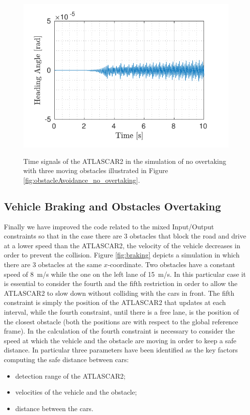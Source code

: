 \begin{figure}[!t]
\begin{minipage}[t]{0.5\textwidth}
		\subcaption{}\label{fig:delta_no_overtaking}
	\end{minipage}
	\begin{minipage}[t]{0.5\textwidth}
		\includegraphics[width=\textwidth]{../../MATLAB/no_overtaking/figure/HeadingAngleVsTime.pdf}
		\subcaption{}\label{fig:theta_no_overtaking}
	\end{minipage}
	\caption{Time signals of the ATLASCAR2 in the simulation of no overtaking with three moving obstacles illustrated in Figure \ref{fig:obstacleAvoidance_no_overtaking}.}
	\label{fig:components_no_overtaking}
\end{figure}

\subsection{Vehicle Braking and Obstacles Overtaking}
Finally we have improved the code related to the mixed Input/Output constraints so that in the case there are 3 obstacles that block the road and drive at a lower speed than the ATLASCAR2, the velocity of the vehicle decreases in order to prevent the collision. Figure \ref{fig:braking} depicts a simulation in which there are 3 obstacles at the same $x$-coordinate. Two obstacles have a constant speed of \SI{8}{m/s} while the one on the left lane of \SI{15}{m/s}.
In this particular case it is essential to consider the fourth and the fifth restriction in order to allow the ATLASCAR2 to slow down without colliding with the cars in front. The fifth constraint is simply the position of the ATLASCAR2 that updates at each interval, while the fourth constraint, until there is a free lane, is the position of the closest obstacle (both the positions are with respect to the global reference frame). In the calculation of the fourth constraint is necessary  to consider the speed at which the vehicle and the obstacle are moving in order to keep a safe distance. In particular three parameters have been identified as the key
factors computing the safe distance between cars:
\begin{itemize}
	\item detection range of the ATLASCAR2;
	\item velocities of the vehicle and the obstacle;
	\item distance between the cars.
\end{itemize}

